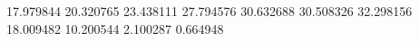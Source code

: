 17.979844
20.320765
23.438111
27.794576
30.632688
30.508326
32.298156
18.009482
10.200544
2.100287
0.664948
